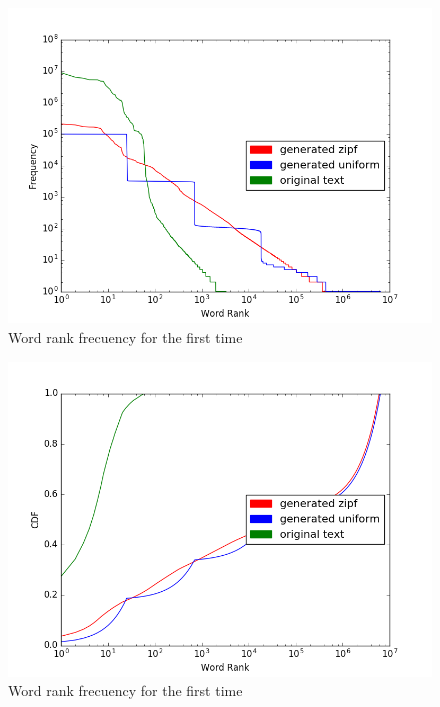 \documentclass{WeSTassignment}
\begin{document}
\begin{figure}[h!]
  \centering
  \includegraphics[scale=0.5]{word_rank_freq_1.png}
   \caption{Word rank frecuency for the first time}
     \label{fig:dig} 
\end{figure}

\begin{figure}[h!]
  \centering
  \includegraphics[scale=0.5]{cdf_1.png}
   \caption{Word rank frecuency for the first time}
     \label{fig:dig} 
\end{figure}
\end{document}
